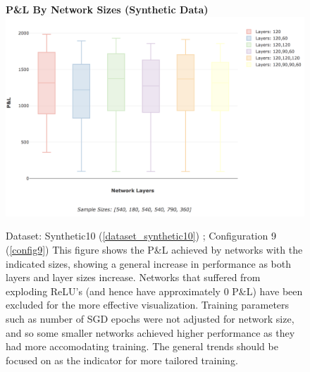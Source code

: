 \documentclass[a4paper,11pt,oneside]{article}
\theoremstyle{plain}
\theoremstyle{definition}
\begin{document}
\begin{figure}[H]
	\centering 
	\textbf{P\&L By Network Sizes (Synthetic Data)}
	\includegraphics[scale=0.3]{images/results/network/synth_pl_box.png} 
	\caption[P\&L By Network Sizes (Synthetic Data)]{Dataset: Synthetic10 (\ref{dataset_synthetic10}) ; Configuration 9 (\ref{config9})
		\newline This figure shows the P\&L achieved by networks with the indicated sizes, showing a general increase in performance as both layers and layer sizes increase. Networks that suffered from exploding ReLU's (and hence have approximately 0 P\&L) have been excluded for the more effective visualization. Training parameters such as number of SGD epochs were not adjusted for network size, and so some smaller networks achieved higher performance as they had more accomodating training. The general trends should be focused on as the indicator for more tailored training.}
	\label{figure-results_synth_pl_box}
\end{figure}
\end{document}
